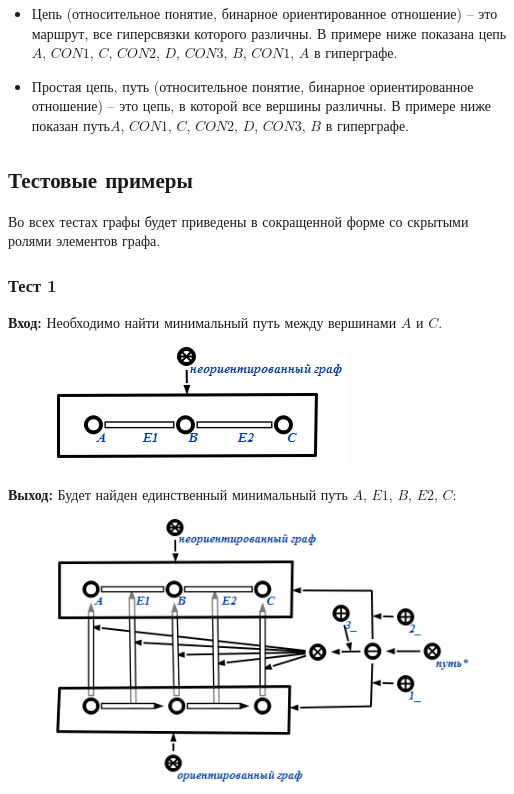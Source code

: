 \begin{itemize}
\item Цепь (относительное понятие, бинарное ориентированное отношение)
  – это маршрут, все гиперсвязки которого различны. В примере ниже
  показана цепь $A$, $CON1$, $C$, $CON2$, $D$, $CON3$, $B$, $CON1$,
  $A$ в гиперграфе.
 
\item Простая цепь, путь (относительное понятие, бинарное
  ориентированное отношение) – это цепь, в которой все вершины
  различны. В примере ниже показан путь$A$, $CON1$, $C$, $CON2$, $D$,
  $CON3$, $B$ в гиперграфе.

\end{itemize}

\subsection{Тестовые примеры}
\label{sec:-Graph_onto_tests}

Во всех тестах графы будет приведены в сокращенной форме со скрытыми
ролями элементов графа.

\newpage

\subsubsection{Тест 1}
\textbf{Вход:}
Необходимо найти минимальный путь между вершинами $A$ и $C$. 

\begin{figure}[h!]
  \centering
  \includegraphics{images/2/test/1_In}
  \label{fig:Test1_In}
\end{figure}

\textbf{Выход:}
Будет найден единственный минимальный путь $A$, $E1$, $B$, $E2$, $C$:

\begin{figure}[h!]
  \centering
  \includegraphics{images/2/test/1_Out}
  \label{fig:Test1_Out}
\end{figure}

